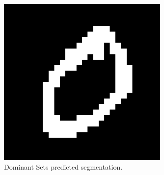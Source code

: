 \documentclass{beamer}
\begin{document}
\begin{frame}
\begin{figure}[H]
\begin{minipage}[t]{0.3\linewidth}
		\end{minipage}
		\hspace{.1cm}
		\begin{minipage}[t]{0.3\linewidth}
			\centering
			\includegraphics[width=0.75\textwidth]{img/advpixel/predicted.png}
			\caption{\small Dominant Sets predicted segmentation.}
		\end{minipage}
	\end{figure}
	

\end{frame}
\end{document}
